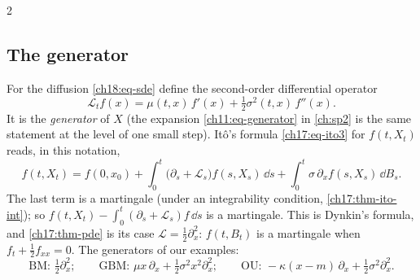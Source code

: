 \begin{paracol}{2}
\subsection{The generator}
For the diffusion \eqref{ch18:eq-sde} define the second-order differential operator
\begin{equation}\label{ch18:eq-gen}
  \mathcal L_tf(x)=\mu(t,x)\,f'(x)+\tfrac12\sigma^2(t,x)\,f''(x).
\end{equation}
It is the \emph{generator} of $X$ (the expansion \eqref{ch11:eq-generator} in \cref{ch:sp2} is the same statement at the level of one small step). It\^o's formula \eqref{ch17:eq-ito3} for $f(t,X_t)$ reads, in this notation,
\begin{equation}\label{ch18:eq-dynkin}
  f(t,X_t)=f(0,x_0)+\int_0^t\bigl(\partial_s+\mathcal L_s\bigr)f(s,X_s)\,\dd s+\int_0^t\sigma\,\partial_xf(s,X_s)\,\dd B_s .
\end{equation}
The last term is a martingale (under an integrability condition, \cref{ch17:thm-ito-int}); so $f(t,X_t)-\int_0^t(\partial_s+\mathcal L_s)f\,\dd s$ is a martingale. This is Dynkin's formula, and \cref{ch17:thm-pde} is its case $\mathcal L=\tfrac12\partial_x^2$: $f(t,B_t)$ is a martingale when $f_t+\tfrac12f_{xx}=0$. The generators of our examples:
\[
  \text{BM: }\tfrac12\partial_x^2;\qquad\text{GBM: }\mu x\,\partial_x+\tfrac12\sigma^2x^2\partial_x^2;\qquad\text{OU: }-\kappa(x-m)\,\partial_x+\tfrac12\sigma^2\partial_x^2 .
\]


\end{paracol}

